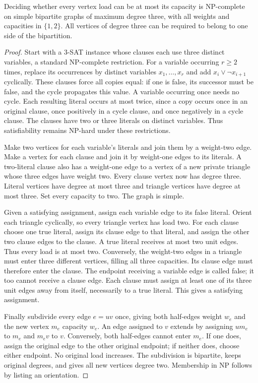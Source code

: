 \begin{lemma}\label{s3:co}
Deciding whether every vertex load can be at most its capacity is
NP-complete on simple bipartite graphs of maximum degree three, with all
weights and capacities in $\{1,2\}$. All vertices of degree three can be
required to belong to one side of the bipartition.
\end{lemma}
\begin{proof}
Start with a 3-SAT instance whose clauses each use three distinct
variables, a standard NP-complete restriction. For a variable occurring $r\ge2$ times,
replace its occurrences by distinct variables $x_1,\ldots,x_r$ and add
$x_i\vee\neg x_{i+1}$ cyclically. These clauses force all copies equal:
if one is false, its successor must be false, and the cycle propagates
this value. A variable occurring once needs no cycle. Each resulting
literal occurs at most twice, since a copy occurs once in an original
clause, once positively in a cycle clause, and once negatively in a cycle
clause. The clauses have two or three literals on distinct variables.
Thus satisfiability remains NP-hard under these restrictions.

Make two vertices for each variable's literals and join them by a
weight-two edge. Make a vertex for each clause and join it by weight-one
edges to its literals. A two-literal clause also has a weight-one edge to
a vertex of a new private triangle whose three edges have weight two.
Every clause vertex now has degree three. Literal vertices have degree at
most three and triangle vertices have degree at most three. Set every
capacity to two. The graph is simple.

Given a satisfying assignment, assign each variable edge to its false
literal. Orient each triangle cyclically, so every triangle vertex has
load two. For each clause choose one true literal, assign its clause edge
to that literal, and assign the other two clause edges to the clause.
A true literal receives at most two unit edges. Thus every load is at
most two. Conversely, the weight-two edges in a triangle must enter
three different vertices, filling all three capacities. Its clause edge
must therefore enter the clause. The endpoint receiving a variable edge
is called false; it too cannot receive a clause edge. Each clause must
assign at least one of its three unit edges away from itself, necessarily
to a true literal. This gives a satisfying assignment.

Finally subdivide every edge $e=uv$ once, giving both half-edges weight
$w_e$ and the new vertex $m_e$ capacity $w_e$. An edge assigned to $v$
extends by assigning $um_e$ to $m_e$ and $m_ev$ to $v$. Conversely, both
half-edges cannot enter $m_e$. If one does, assign the original edge to
the other original endpoint; if neither does, choose either endpoint.
No original load increases. The subdivision is bipartite, keeps original
degrees, and gives all new vertices degree two. Membership in NP follows
by listing an orientation.
\end{proof}

